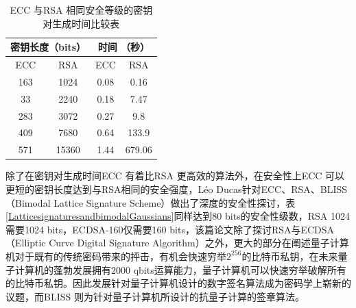 				\begin{table}[!htbp]
				\centering
				\caption{ECC 与RSA 相同安全等级的密钥对生成时间比较表\supercite{Performancecomparisonofellipticcurveandrsadigitalsignatures}}
				\label{ECCtime}
				\begin{tabular}{|c|c|c|c|}
				\hline
				\multicolumn{2}{|c|}{密钥长度（bits）} & \multicolumn{2}{c|}{时间 （秒）} \\ \hline
				ECC & RSA & ECC & RSA \\ \hline
				163 & 1024 & 0.08 & 0.16 \\ \hline
				33 & 2240 & 0.18 & 7.47 \\ \hline
				283 & 3072 & 0.27 & 9.8 \\ \hline
				409 & 7680 & 0.64 & 133.9 \\ \hline
				571 & 15360 & 1.44 & 679.06 \\ \hline
				\end{tabular}
				\end{table}	

				除了在密钥对生成时间ECC 有着比RSA 更高效的算法外，在安全性上ECC 可以更短的密钥长度达到与RSA相同的安全强度，Léo Ducas针对ECC、RSA、BLISS（Bimodal Lattice Signature Scheme）\supercite{LatticesignaturesandbimodalGaussians}做出了深度的安全性探讨，表\ref{LatticesignaturesandbimodalGaussians}同样达到80 bits的安全性级数，RSA 1024需要1024 bits，ECDSA-160\supercite{DeploymentsofEllipticCurveCryptography}仅需要160 bits，该篇论文除了探讨RSA与ECDSA（Elliptic Curve Digital Signature Algorithm）之外，更大的部分在阐述量子计算机对于既有的传统密码带来的抨击，有机会快速穷举$2^{256}$的比特币私钥，在未来量子计算机的蓬勃发展拥有2000 qbits运算能力，量子计算机可以快速穷举破解所有的比特币私钥。因此发展针对量子计算机设计的数字签名算法成为密码学上崭新的议题，而BLISS 则为针对量子计算机所设计的抗量子计算的签章算法。

